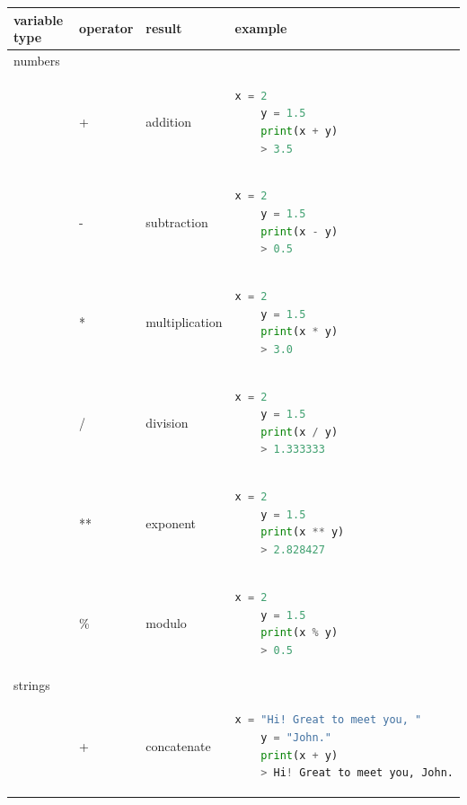 \documentclass[]{article}
\begin{document}
\begin{center}
\begin{tabular}{ | m{5em} | m{5em}| m{7em} | m{20em} | } 
\hline
\textbf{variable type}& \textbf{operator} & \textbf{result} & \textbf{example} \\ 
\hline
\multicolumn{4}{|l|}{numbers} \\
\hline
 & + & addition & \begin{lstlisting}[language=python]
    x = 2
    y = 1.5
    print(x + y)
    > 3.5
\end{lstlisting} \\ 
\hline
 & - & subtraction & \begin{lstlisting}[language=python]
    x = 2
    y = 1.5
    print(x - y)
    > 0.5
\end{lstlisting} \\ 
\hline
 & * & multiplication & \begin{lstlisting}[language=python]
    x = 2
    y = 1.5
    print(x * y)
    > 3.0
\end{lstlisting} \\ 
\hline

 & / & division & \begin{lstlisting}[language=python]
    x = 2
    y = 1.5
    print(x / y)
    > 1.333333
\end{lstlisting} \\ 
\hline

 & ** & exponent & \begin{lstlisting}[language=python]
    x = 2
    y = 1.5
    print(x ** y)
    > 2.828427
\end{lstlisting} \\ 
\hline

 & \% & modulo & \begin{lstlisting}[language=python]
    x = 2
    y = 1.5
    print(x % y)
    > 0.5
\end{lstlisting} \\ 
\hline


\multicolumn{4}{|l|}{strings} \\
\hline
 & + & concatenate & \begin{lstlisting}[language=python]
    x = "Hi! Great to meet you, "
    y = "John."
    print(x + y)
    > Hi! Great to meet you, John.
\end{lstlisting} \\ 
\hline

\end{tabular}
\end{center}
\end{document}
